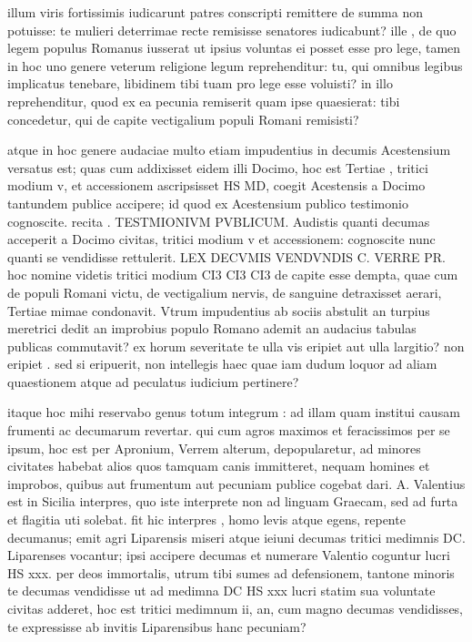  illum viris fortissimis iudicarunt patres conscripti remittere de summa non potuisse: te mulieri deterrimae recte remisisse senatores iudicabunt? ille , de quo legem populus Romanus iusserat ut ipsius voluntas ei posset esse pro lege, tamen in hoc uno genere veterum religione legum reprehenditur: tu, qui omnibus legibus implicatus tenebare, libidinem tibi tuam pro lege esse voluisti? in illo reprehenditur, quod ex ea pecunia remiserit quam ipse quaesierat: tibi concedetur, qui de capite vectigalium populi Romani remisisti?

 atque in hoc genere audaciae multo etiam impudentius in decumis Acestensium versatus est; quas cum addixisset eidem illi Docimo, hoc est Tertiae , tritici modium v, et accessionem ascripsisset HS MD, coegit Acestensis a Docimo tantundem publice accipere; id quod ex Acestensium publico testimonio cognoscite. recita . TESTMIONIVM PVBLICUM. Audistis quanti decumas acceperit a Docimo civitas, tritici modium v et accessionem: cognoscite nunc quanti se vendidisse rettulerit. LEX DECVMIS VENDVNDIS C. VERRE PR. hoc nomine videtis tritici modium CI3 CI3 CI3 de capite esse dempta, quae cum de populi Romani victu, de vectigalium nervis, de sanguine detraxisset aerari, Tertiae mimae condonavit. Vtrum impudentius ab sociis abstulit an turpius meretrici dedit an improbius populo Romano ademit an audacius tabulas publicas commutavit? ex horum severitate te ulla vis eripiet aut ulla largitio? non eripiet . sed si eripuerit, non intellegis haec quae iam dudum loquor ad aliam quaestionem atque ad peculatus iudicium pertinere?

 itaque hoc mihi reservabo genus totum integrum : ad illam quam institui causam frumenti ac decumarum revertar. qui cum agros maximos et feracissimos per se ipsum, hoc est per Apronium, Verrem alterum, depopularetur, ad minores civitates habebat alios quos tamquam canis immitteret, nequam homines et improbos, quibus aut frumentum aut pecuniam publice cogebat dari. A. Valentius est in Sicilia interpres, quo iste interprete non ad linguam Graecam, sed ad furta et flagitia uti solebat. fit hic interpres , homo levis atque egens, repente decumanus; emit agri Liparensis miseri atque ieiuni decumas tritici medimnis DC. Liparenses vocantur; ipsi accipere decumas et numerare Valentio coguntur lucri HS xxx. per deos immortalis, utrum tibi sumes ad defensionem, tantone minoris te decumas vendidisse ut ad medimna DC HS xxx lucri statim sua voluntate civitas adderet, hoc est tritici medimnum ii, an, cum magno decumas vendidisses, te expressisse ab invitis Liparensibus hanc pecuniam?

